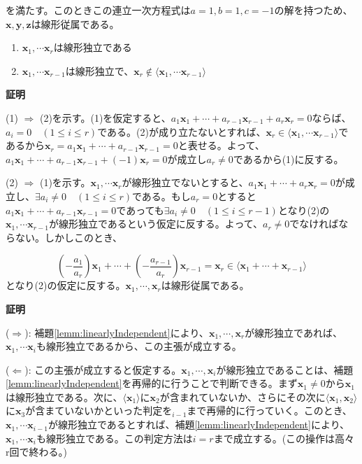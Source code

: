 \documentclass[dvipdfmx,autodetect-engine]{jsarticle}
\begin{document}
を満たす。このときこの連立一次方程式は$a = 1, b = 1, c = -1$の解を持つため、$\bm{x}, \bm{y}, \bm{z}$は線形従属である。

\label{lemm:linearlyIndependent}

\begin{enumerate}
\renewcommand{\labelenumi}{(\arabic{enumi})}
\item $\bm{x}_1, \cdots \bm{x}_r$は線形独立である
\item $\bm{x}_1, \cdots \bm{x}_{r-1}$は線形独立で、$\bm{x}_r \notin \langle \bm{x}_1, \cdots \bm{x}_{r-1} \rangle$
\end{enumerate}

{\bf 証明}

(1) $\Rightarrow$ (2)を示す。(1)を仮定すると、$a_1\bm{x}_1 + \cdots + a_{r-1}\bm{x}_{r-1} + a_r\bm{x}_r = 0$ならば、$a_i = 0 \quad (1 \leq i \leq r)$である。(2)が成り立たないとすれば、$\bm{x}_r \in \langle \bm{x}_1, \cdots \bm{x}_{r-1} \rangle$であるから$\bm{x}_r = a_1\bm{x}_1 + \cdots + a_{r-1}\bm{x}_{r-1} = 0$と表せる。よって、$a_1\bm{x}_1 + \cdots + a_{r-1}\bm{x}_{r-1} + (-1)\bm{x}_r = 0$が成立し$a_r \neq 0$であるから(1)に反する。


(2) $\Rightarrow$ (1)を示す。$\bm{x}_1, \cdots \bm{x}_r$が線形独立でないとすると、$a_1\bm{x}_1 + \cdots + a_{r}\bm{x}_{r} = 0$が成立し、$\exists a_i \neq 0 \quad (1 \leq i \leq r)$である。もし$a_r = 0$とすると$a_1\bm{x}_1 + \cdots + a_{r-1}\bm{x}_{r-1} = 0$であっても$\exists a_i \neq 0 \quad (1 \leq i \leq r -1)$となり(2)の$\bm{x}_1, \cdots \bm{x}_{r-1}$が線形独立であるという仮定に反する。よって、$a_r \neq 0$でなければならない。しかしこのとき、

$$
 \left(-\frac{a_1}{a_r}\right)\bm{x}_1 + \cdots +  \left(-\frac{a_{r-1}}{a_r}\right)\bm{x}_{r-1} = \bm{x}_r \in \langle \bm{x}_1 + \cdots + \bm{x}_{r-1} \rangle
$$
となり(2)の仮定に反する。$\bm{x}_1, \cdots, \bm{x}_{r}$は線形従属である。

\label{rem:independent}

{\bf 証明}

($\Rightarrow$): 補題\ref{lemm:linearlyIndependent}により、$\bm{x}_1, \cdots, \bm{x}_r$が線形独立であれば、$\bm{x}_1, \cdots \bm{x}_i$も線形独立であるから、この主張が成立する。

($\Leftarrow$): この主張が成立すると仮定する。$\bm{x}_1, \cdots, \bm{x}_i$が線形独立であることは、補題\ref{lemm:linearlyIndependent}を再帰的に行うことで判断できる。まず$\bm{x}_1 \neq 0$から$\bm{x}_1$は線形独立である。次に、$\langle \bm{x}_1 \rangle$に$\bm{x}_2$が含まれていないか、さらにその次に$\langle \bm{x}_1, \bm{x}_2 \rangle$に$\bm{x}_3$が含まていないかといった判定を${}_{i-1}$まで再帰的に行っていく。このとき、$\bm{x}_1, \cdots \bm{x}_{i-1}$が線形独立であるとすれば、補題\ref{lemm:linearlyIndependent}により、$\bm{x}_1, \cdots \bm{x}_i$も線形独立である。この判定方法は$i = r$まで成立する。(この操作は高々r回で終わる。)
\end{document}
